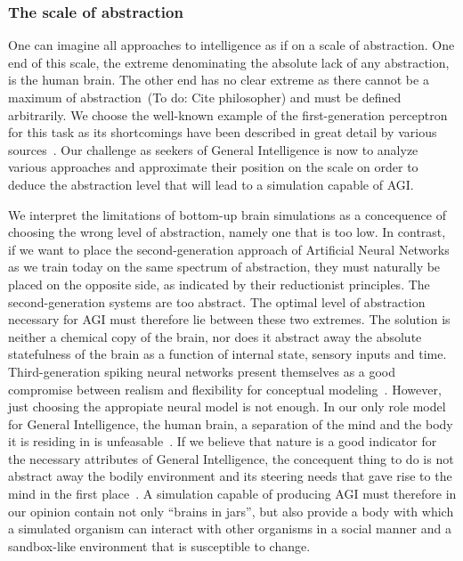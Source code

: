 \subsubsection{The scale of abstraction}
One can imagine all approaches to intelligence as if on a scale of abstraction.
One end of this scale, the extreme denominating the absolute lack of any abstraction, is the human brain.
The other end has no clear extreme as there cannot be a maximum of abstraction~(To do: Cite philosopher) and must 
be defined arbitrarily. We choose the well-known example of the first-generation perceptron for this task as its
shortcomings have been described in great detail by various sources~\cite{Anderson1995}.
Our challenge as seekers of General Intelligence is now to analyze various approaches and approximate their position on
the scale on order to deduce the abstraction level that will lead to a simulation capable of AGI.

We interpret the limitations of bottom-up brain simulations as a concequence of choosing the wrong level of abstraction, 
namely one that is too low. In contrast, if we want to place the second-generation approach of Artificial Neural Networks as we train today on
the same spectrum of abstraction, they must naturally be placed on the opposite side, as indicated by their reductionist
principles. The second-generation systems are too abstract. The optimal level of abstraction necessary for AGI must 
therefore lie between these two extremes. The solution is neither a chemical copy of the brain, nor does it abstract 
away the absolute statefulness of the brain as a function of internal state, sensory inputs and time.
Third-generation spiking neural networks present themselves as a good compromise between
realism and flexibility for conceptual modeling~\cite{Paugam-Moisy2012}. However, just choosing the appropiate
neural model is not enough. In our only role model for General Intelligence, the human brain, a separation of the mind and
the body it is residing in is unfeasable~\cite{Dudai2014}. If we believe that nature is a good 
indicator for the necessary attributes of General Intelligence, the concequent thing to do is not 
abstract away the bodily environment and its steering needs that gave rise to the mind in the first place~\cite{Jekely2010}. 
A simulation capable of producing AGI must therefore in our opinion contain not only ``brains in jars'', but 
also provide a body with which a simulated organism can interact with other organisms in a social manner and a 
sandbox-like environment that is susceptible to change.
